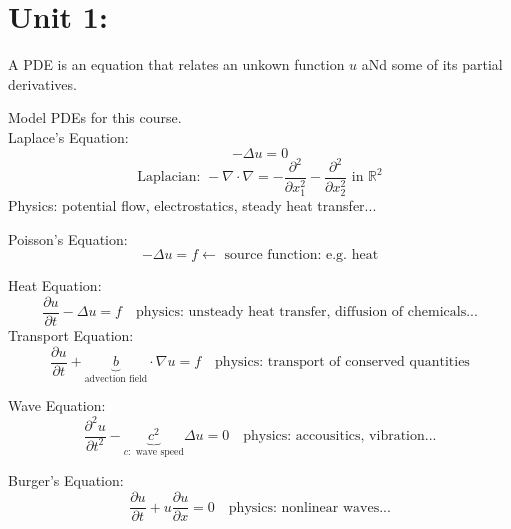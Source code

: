 
\section{Unit 1:}

\begin{definition}
    A PDE is an equation that relates an unkown function $u$ aNd some of its partial derivatives.
    \begin{center}
    \end{center}
\end{definition}

\begin{example}
    Model PDEs for this course.
    \\Laplace's Equation:
    \[-\Delta u = 0\]
    \[\text{Laplacian: }-\nabla \cdot \nabla = -\frac{\partial^2}{\partial x_1^2}-\frac{\partial^2}{\partial x_2^2} \text{ in }\mathbb{R}^2 \]
    Physics: potential flow, electrostatics, steady heat transfer...
\end{example}
Poisson's Equation:
\[-\Delta u = f \longleftarrow  \text{ source function: e.g. heat}\]

Heat Equation:
\[\frac{\partial u}{\partial t} - \Delta u = f \quad \text{physics: unsteady heat transfer, diffusion of chemicals...}\]
Transport Equation:
\[\frac{\partial u}{\partial t} + \underbrace{b}_{\text{advection field}} \cdot \nabla u = f \quad \text{physics: transport of conserved quantities}\]

Wave Equation:
\[\frac{\partial^2 u}{\partial t^2} - \underbrace{c^2}_{c: \text{ wave speed}} \Delta u = 0 \quad \text{physics: accousitics, vibration...}\]

Burger's Equation:
\[\frac{\partial u}{\partial t} + u\frac{\partial u}{\partial x} = 0 \quad \text{physics: nonlinear waves...}\]


